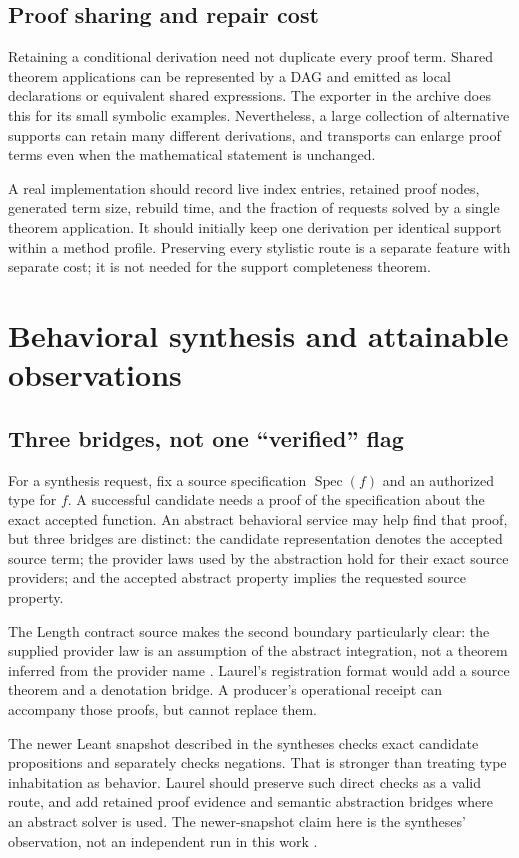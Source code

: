 \documentclass[11pt,a4paper]{article}
\newcommand{\code}[1]{\texttt{\detokenize{#1}}}
\theoremstyle{definition}
\theoremstyle{remark}
\begin{document}
\subsection{Proof sharing and repair cost}
Retaining a conditional derivation need not duplicate every proof term. Shared theorem applications can be represented by a DAG and emitted as local \code{have} declarations or equivalent shared expressions. The exporter in the archive does this for its small symbolic examples. Nevertheless, a large collection of alternative supports can retain many different derivations, and transports can enlarge proof terms even when the mathematical statement is unchanged.

A real implementation should record live index entries, retained proof nodes, generated term size, rebuild time, and the fraction of requests solved by a single theorem application. It should initially keep one derivation per identical support within a method profile. Preserving every stylistic route is a separate feature with separate cost; it is not needed for the support completeness theorem.

\section{Behavioral synthesis and attainable observations}\label{sec:behavior}
\subsection{Three bridges, not one ``verified'' flag}
For a synthesis request, fix a source specification $\operatorname{Spec}(f)$ and an authorized type for $f$. A successful candidate needs a proof of the specification about the exact accepted function. An abstract behavioral service may help find that proof, but three bridges are distinct: the candidate representation denotes the accepted source term; the provider laws used by the abstraction hold for their exact source providers; and the accepted abstract property implies the requested source property.

The Length contract source makes the second boundary particularly clear: the supplied provider law is an assumption of the abstract integration, not a theorem inferred from the provider name \cite{lengthcontract}. Laurel's registration format would add a source theorem and a denotation bridge. A producer's operational receipt can accompany those proofs, but cannot replace them.

The newer Leant snapshot described in the syntheses checks exact candidate propositions and separately checks negations. That is stronger than treating type inhabitation as behavior. Laurel should preserve such direct checks as a valid route, and add retained proof evidence and semantic abstraction bridges where an abstract solver is used. The newer-snapshot claim here is the syntheses' observation, not an independent run in this work \cite{r3a,r3b}.
\end{document}
